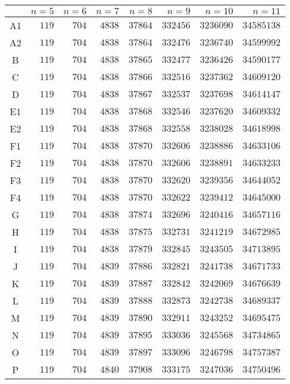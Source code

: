 \documentclass[11pt]{amsart}
\theoremstyle{definition}
\begin{document}
\begin{center}
	\centering
	\begin{tabular}{|crrrrrrr|}
		\hline
		& $n=5$ & $n=6$ & $n=7$ & $n=8$ & $n=9$ & $n=10$ & $n=11$ \\ \hline
A1 & $119$ & $704$ & $4838$ & $37864$ & $332456$ & $3236090$ & $34585138$ \\
A2 & $119$ & $704$ & $4838$ & $37864$ & $332476$ & $3236740$ & $34599992$ \\
B & $119$ & $704$ & $4838$ & $37865$ & $332477$ & $3236426$ & $34590177$ \\
C & $119$ & $704$ & $4838$ & $37866$ & $332516$ & $3237362$ & $34609120$ \\
D & $119$ & $704$ & $4838$ & $37867$ & $332537$ & $3237698$ & $34614147$ \\
E1 & $119$ & $704$ & $4838$ & $37868$ & $332546$ & $3237620$ & $34609332$ \\
E2 & $119$ & $704$ & $4838$ & $37868$ & $332558$ & $3238028$ & $34618998$ \\
F1 & $119$ & $704$ & $4838$ & $37870$ & $332606$ & $3238886$ & $34633106$ \\
F2 & $119$ & $704$ & $4838$ & $37870$ & $332606$ & $3238891$ & $34633233$ \\
F3 & $119$ & $704$ & $4838$ & $37870$ & $332620$ & $3239356$ & $34644052$ \\
F4 & $119$ & $704$ & $4838$ & $37870$ & $332622$ & $3239412$ & $34645000$ \\
G & $119$ & $704$ & $4838$ & $37874$ & $332696$ & $3240416$ & $34657116$ \\
H & $119$ & $704$ & $4838$ & $37875$ & $332731$ & $3241219$ & $34672985$ \\
I & $119$ & $704$ & $4838$ & $37879$ & $332845$ & $3243505$ & $34713895$ \\
J & $119$ & $704$ & $4839$ & $37886$ & $332821$ & $3241738$ & $34671733$ \\
K & $119$ & $704$ & $4839$ & $37887$ & $332842$ & $3242069$ & $34676639$ \\
L & $119$ & $704$ & $4839$ & $37888$ & $332873$ & $3242738$ & $34689337$ \\
M & $119$ & $704$ & $4839$ & $37890$ & $332911$ & $3243252$ & $34695475$ \\
N & $119$ & $704$ & $4839$ & $37895$ & $333036$ & $3245568$ & $34734865$ \\
O & $119$ & $704$ & $4839$ & $37897$ & $333096$ & $3246798$ & $34757387$ \\
P & $119$ & $704$ & $4840$ & $37908$ & $333175$ & $3247036$ & $34750496$ \\

\end{tabular}
\end{center}
\end{document}
